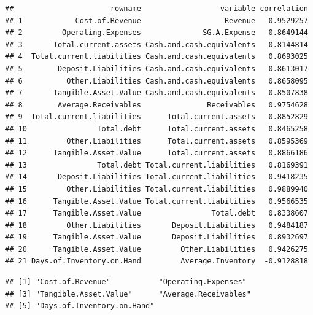 \documentclass[11pt,]{article}
\begin{document}
\begin{verbatim}
##                      rowname                  variable correlation
## 1            Cost.of.Revenue                   Revenue   0.9529257
## 2         Operating.Expenses              SG.A.Expense   0.8649144
## 3       Total.current.assets Cash.and.cash.equivalents   0.8144814
## 4  Total.current.liabilities Cash.and.cash.equivalents   0.8693025
## 5        Deposit.Liabilities Cash.and.cash.equivalents   0.8613017
## 6          Other.Liabilities Cash.and.cash.equivalents   0.8658095
## 7       Tangible.Asset.Value Cash.and.cash.equivalents   0.8507838
## 8        Average.Receivables               Receivables   0.9754628
## 9  Total.current.liabilities      Total.current.assets   0.8852829
## 10                Total.debt      Total.current.assets   0.8465258
## 11         Other.Liabilities      Total.current.assets   0.8595369
## 12      Tangible.Asset.Value      Total.current.assets   0.8866186
## 13                Total.debt Total.current.liabilities   0.8169391
## 14       Deposit.Liabilities Total.current.liabilities   0.9418235
## 15         Other.Liabilities Total.current.liabilities   0.9889940
## 16      Tangible.Asset.Value Total.current.liabilities   0.9566535
## 17      Tangible.Asset.Value                Total.debt   0.8338607
## 18         Other.Liabilities       Deposit.Liabilities   0.9484187
## 19      Tangible.Asset.Value       Deposit.Liabilities   0.8932697
## 20      Tangible.Asset.Value         Other.Liabilities   0.9426275
## 21 Days.of.Inventory.on.Hand         Average.Inventory  -0.9128818
\end{verbatim}

\begin{verbatim}
## [1] "Cost.of.Revenue"           "Operating.Expenses"       
## [3] "Tangible.Asset.Value"      "Average.Receivables"      
## [5] "Days.of.Inventory.on.Hand"
\end{verbatim}
\end{document}
